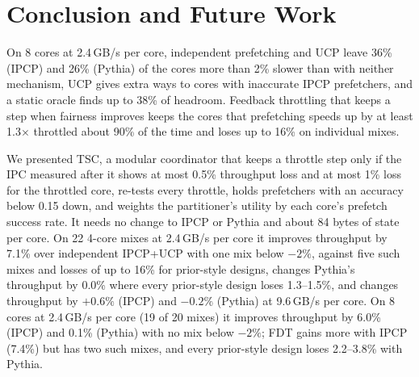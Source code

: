 \section{Conclusion and Future Work}
\label{sec:conclusion}

On 8 cores at 2.4\,GB/s per core, independent prefetching and UCP leave 36\% (IPCP) and 26\% (Pythia) of the cores
more than 2\% slower than with neither mechanism, UCP gives extra ways to cores with inaccurate IPCP prefetchers, and
a static oracle finds up to 38\% of headroom.  Feedback throttling that keeps a step when fairness improves keeps the
cores that prefetching speeds up by at least 1.3$\times$ throttled about 90\% of the time and loses up to 16\% on
individual mixes.

We presented TSC, a modular coordinator that keeps a throttle step only if the IPC measured after it shows at most 0.5\%
throughput loss and at most 1\% loss for the throttled core, re-tests every throttle, holds prefetchers with an
accuracy below 0.15 down, and weights the partitioner's utility by each core's prefetch success rate.  It needs no
change to IPCP or Pythia and about 84 bytes of state per core.  On 22 4-core mixes at 2.4\,GB/s per core it
improves throughput by 7.1\% over independent IPCP+UCP with one mix below $-2\%$, against five such mixes and losses
of up to 16\% for prior-style designs, changes Pythia's throughput by 0.0\% where every prior-style design loses 1.3--1.5\%, and changes throughput by
$+0.6\%$ (IPCP) and $-0.2\%$ (Pythia) at 9.6\,GB/s per core.
On 8 cores at 2.4\,GB/s per core (19 of 20 mixes) it improves throughput by 6.0\% (IPCP) and 0.1\% (Pythia) with no
mix below $-2\%$; FDT gains more with IPCP (7.4\%) but has two such mixes, and every prior-style design loses
2.2--3.8\% with Pythia.

